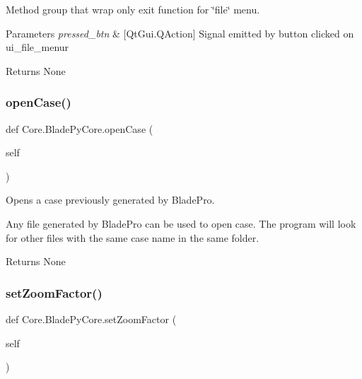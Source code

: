 Method group that wrap only exit function for \char`\"{}file\char`\"{} menu. 


\begin{DoxyParams}{Parameters}
{\em pressed\+\_\+btn} & \mbox{[}Qt\+Gui.\+Q\+Action\mbox{]} Signal emitted by button clicked on ui\+\_\+file\+\_\+menur \\
\hline
\end{DoxyParams}
\begin{DoxyReturn}{Returns}
None 
\end{DoxyReturn}
\hypertarget{class_core_1_1_blade_py_core_ac45b825bd62e01689fb2987a0a2d850a}{}\label{class_core_1_1_blade_py_core_ac45b825bd62e01689fb2987a0a2d850a} 
\subsubsection{\texorpdfstring{open\+Case()}{openCase()}}
{\footnotesize\ttfamily def Core.\+Blade\+Py\+Core.\+open\+Case (\begin{DoxyParamCaption}\item[{}]{self }\end{DoxyParamCaption})}



Opens a case previously generated by Blade\+Pro. 

Any file generated by Blade\+Pro can be used to open case. The program will look for other files with the same case name in the same folder.

\begin{DoxyReturn}{Returns}
None 
\end{DoxyReturn}
\hypertarget{class_core_1_1_blade_py_core_a2c818d907d8c5797873e1a7ad54c7d13}{}\label{class_core_1_1_blade_py_core_a2c818d907d8c5797873e1a7ad54c7d13} 
\subsubsection{\texorpdfstring{set\+Zoom\+Factor()}{setZoomFactor()}}
{\footnotesize\ttfamily def Core.\+Blade\+Py\+Core.\+set\+Zoom\+Factor (\begin{DoxyParamCaption}\item[{}]{self }\end{DoxyParamCaption})}



